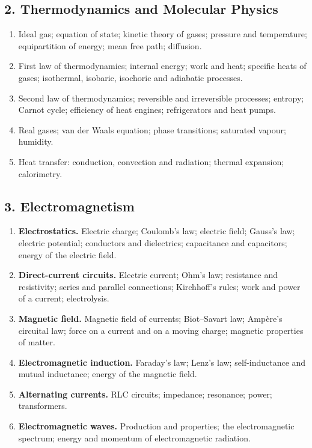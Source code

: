 \subsection*{2. Thermodynamics and Molecular Physics}

\begin{enumerate}[label=\arabic*.,leftmargin=2.2em,itemsep=1pt,topsep=2pt]
\item Ideal gas; equation of state; kinetic theory of gases; pressure and temperature; equipartition
of energy; mean free path; diffusion.
\item First law of thermodynamics; internal energy; work and heat; specific heats of gases;
isothermal, isobaric, isochoric and adiabatic processes.
\item Second law of thermodynamics; reversible and irreversible processes; entropy; Carnot cycle;
efficiency of heat engines; refrigerators and heat pumps.
\item Real gases; van der Waals equation; phase transitions; saturated vapour; humidity.
\item Heat transfer: conduction, convection and radiation; thermal expansion; calorimetry.
\end{enumerate}

\subsection*{3. Electromagnetism}

\begin{enumerate}[label=\arabic*.,leftmargin=2.2em,itemsep=1pt,topsep=2pt]
\item \textbf{Electrostatics.} Electric charge; Coulomb's law; electric field; Gauss's law; electric
potential; conductors and dielectrics; capacitance and capacitors; energy of the electric field.
\item \textbf{Direct-current circuits.} Electric current; Ohm's law; resistance and resistivity;
series and parallel connections; Kirchhoff's rules; work and power of a current; electrolysis.
\item \textbf{Magnetic field.} Magnetic field of currents; Biot--Savart law; Amp\`ere's circuital
law; force on a current and on a moving charge; magnetic properties of matter.
\item \textbf{Electromagnetic induction.} Faraday's law; Lenz's law; self-inductance and mutual
inductance; energy of the magnetic field.
\item \textbf{Alternating currents.} RLC circuits; impedance; resonance; power; transformers.
\item \textbf{Electromagnetic waves.} Production and properties; the electromagnetic spectrum;
energy and momentum of electromagnetic radiation.
\end{enumerate}


